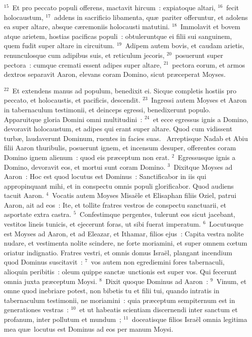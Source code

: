${}^{15}$~Et pro peccato populi offerens, mactavit hircum~: expiatoque altari,
${}^{16}$~fecit holocaustum,
${}^{17}$~addens in sacrificio libamenta, qu\ae\ pariter offeruntur, et adolens ea super altare, absque c\ae remoniis holocausti matutini.
${}^{18}$~Immolavit et bovem atque arietem, hostias pacificas populi~: obtuleruntque ei filii sui sanguinem, quem fudit super altare in circuitum.
${}^{19}$~Adipem autem bovis, et caudam arietis, renunculosque cum adipibus suis, et reticulum jecoris,
${}^{20}$~posuerunt super pectora~: cumque cremati essent adipes super altare,
${}^{21}$~pectora eorum, et armos dextros separavit Aaron, elevans coram Domino, sicut pr\ae ceperat Moyses.


${}^{22}$~Et extendens manus ad populum, benedixit ei. Sicque completis hostiis pro peccato, et holocaustis, et pacificis, descendit.
${}^{23}$~Ingressi autem Moyses et Aaron in tabernaculum testimonii, et deinceps egressi, benedixerunt populo. Apparuitque gloria Domini omni multitudini~:
${}^{24}$~et ecce egressus ignis a Domino, devoravit holocaustum, et adipes qui erant super altare. Quod cum vidissent turb\ae , laudaverunt Dominum, ruentes in facies suas.
~\lettrine[lines=10,image=true,loversize=0.05,lraise=-0.03]{A}{}rreptisque Nadab et Abiu filii Aaron thuribulis, posuerunt ignem, et incensum desuper, offerentes coram Domino ignem alienum~: quod eis pr\ae ceptum non erat.
${}^{2}$~Egressusque ignis a Domino, devoravit eos, et mortui sunt coram Domino.
${}^{3}$~Dixitque Moyses ad Aaron~: Hoc est quod locutus est Dominus~: Sanctificabor in iis qui appropinquant mihi, et in conspectu omnis populi glorificabor. Quod audiens tacuit Aaron.
${}^{4}$~Vocatis autem Moyses Misa\"ele et Elisaphan filiis Oziel, patrui Aaron, ait ad eos~: Ite, et tollite fratres vestros de conspectu sanctuarii, et asportate extra castra.
${}^{5}$~Confestimque pergentes, tulerunt eos sicut jacebant, vestitos lineis tunicis, et ejecerunt foras, ut sibi fuerat imperatum.
${}^{6}$~Locutusque est Moyses ad Aaron, et ad Eleazar, et Ithamar, filios ejus~: Capita vestra nolite nudare, et vestimenta nolite scindere, ne forte moriamini, et super omnem cœtum oriatur indignatio. Fratres vestri, et omnis domus Isra\"el, plangant incendium quod Dominus suscitavit~:
${}^{7}$~vos autem non egrediemini fores tabernaculi, alioquin peribitis~: oleum quippe sanct\ae\ unctionis est super vos. Qui fecerunt omnia juxta pr\ae ceptum Moysi.
${}^{8}$~Dixit quoque Dominus ad Aaron~:
${}^{9}$~Vinum, et omne quod inebriare potest, non bibetis tu et filii tui, quando intratis in tabernaculum testimonii, ne moriamini~: quia pr\ae ceptum sempiternum est in generationes vestras~:
${}^{10}$~et ut habeatis scientiam discernendi inter sanctum et profanum, inter pollutum et mundum~;
${}^{11}$~doceatisque filios Isra\"el omnia legitima mea qu\ae\ locutus est Dominus ad eos per manum Moysi.


